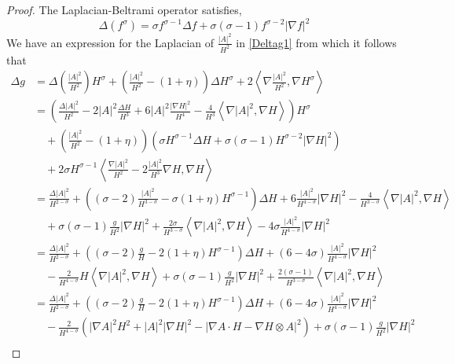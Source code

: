\begin{proof}
    The Laplacian-Beltrami operator satisfies, 
    \[ \Delta(f^{\sigma}) = \sigma f^{\sigma-1}\Delta f + \sigma(\sigma-1)f^{\sigma -2}|\nabla f|^{2} \]
    We have an expression for the Laplacian of $ \frac{|A|^{2}}{H^{2}} $ in \cref{Deltag1} from which it follows that  \begin{align*}
        \Delta g & = \Delta  \left(\frac{|A|^{2}}{H^{2}} \right)H^{\sigma} + \left( \frac{|A|^{2}}{H^{2}} - (1+\eta) \right)\Delta H^{\sigma} + 2\left<  \nabla  \frac{|A|^{2}}{H^{2}} , \nabla H^{\sigma} \right> \\
        & = \left( \frac{\Delta |A|^{2}}{{H^{2}}} - 2|A|^{2} \frac{\Delta H}{H^{3}} + 6|A|^{2} \frac{| \nabla H|^{2}}{H^{4}} - \frac{4}{H^{3}}\left< \nabla |A|^{2}, \nabla H \right> \right)H^{\sigma} \\
        & \quad + \left( \frac{|A|^{2}}{H^{2}} - (1+\eta) \right)\left( \sigma H^{\sigma-1}\Delta H + \sigma (\sigma -1)H^{\sigma -2}|\nabla H|^{2} \right) \\
        & \quad + 2\sigma H^{\sigma-1}\left< \frac{\nabla|A|^{2}}{H^{2}} -2 \frac{|A|^{2}}{H^{3}} \nabla H , \nabla H\right> \\
        & =  \frac{\Delta |A|^{2}}{H^{2-\sigma}} + \left( (\sigma-2) \frac{|A|^{2}}{H^{3-\sigma}} - \sigma(1+\eta)H^{\sigma-1} \right)\Delta H + 6 \frac{|A|^{2}}{H^{4-\sigma}}|\nabla H|^{2} - \frac{4}{H^{3-\sigma}}\left< \nabla |A|^{2}, \nabla H \right>  \\
        & \quad + \sigma(\sigma -1)\frac{g}{H^{2}}|\nabla H|^{2} + \frac{2 \sigma}{H^{3-\sigma}} \left< \nabla |A|^{2}, \nabla H \right> - 4\sigma \frac{|A|^{2}}{H^{4-\sigma}}|\nabla H|^{2} \\
        & =  \frac{\Delta |A|^{2}}{H^{2-\sigma}} + \left( (\sigma-2)\frac{g}{H} - 2(1+\eta)H^{\sigma-1} \right)\Delta H + \left( 6-4 \sigma \right)\frac{|A|^{2}}{H^{4-\sigma}}|\nabla H|^{2}  \\
        & \quad - \frac{2}{H^{4-\sigma}}H\left< \nabla |A|^{2}, \nabla H \right> + \sigma(\sigma -1)\frac{g}{H^{2}}|\nabla H|^{2} + \frac{2(\sigma -1)}{H^{3-\sigma}} \left< \nabla |A|^{2}, \nabla H \right> \\
        & = \frac{\Delta |A|^{2}}{H^{2-\sigma}} + \left( (\sigma-2)\frac{g}{H} - 2(1+\eta)H^{\sigma-1} \right)\Delta H + \left( 6-4 \sigma \right)\frac{|A|^{2}}{H^{4-\sigma}}|\nabla H|^{2}  \\
        & \quad - \frac{2}{H^{4-\sigma}}\left( |\nabla A|^{2}H^{2} + |A|^{2}|\nabla H|^{2}-|\nabla A \cdot H - \nabla H \otimes A|^{2} \right) + \sigma(\sigma -1)\frac{g}{H^{2}}|\nabla H|^{2} \\

\end{align*}
\end{proof}

